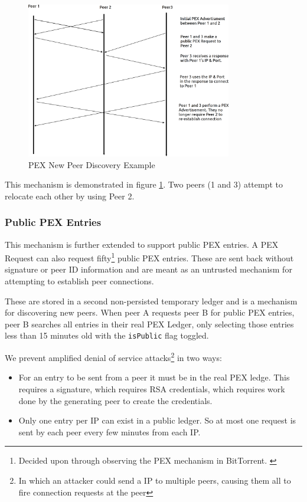 \documentclass[11pt, a4paper, twoside]{report}
\def\code#1{\texttt{#1}}
\begin{document}
\begin{figure}
 \centering
 \includegraphics[width=0.8\textwidth]{pex-new-peer}
 \caption{PEX New Peer Discovery Example}
 \label{fig:pex-new-peer}
\end{figure}

This mechanism is demonstrated in figure \ref{fig:pex-new-peer}. Two peers (1 and 3) attempt to relocate each other by using Peer 2.

\subsubsection{Public PEX Entries}

This mechanism is further extended to support public PEX entries. A PEX Request can also request fifty\footnote{Decided upon through observing the PEX mechanism in BitTorrent. \citep{vuze2010vuze}} public PEX entries. These are sent back without signature or peer ID information and are meant as an untrusted mechanism for attempting to establish peer connections.

These are stored in a second non-persisted temporary ledger and is a mechanism for discovering new peers. When peer A requests peer B for public PEX entries, peer B searches all entries in their real PEX Ledger, only selecting those entries less than 15 minutes old with the \code{isPublic} flag toggled.

We prevent amplified denial of service attacks\footnote{In which an attacker could send a IP to multiple peers, causing them all to fire connection requests at the peer} in two ways:

\begin{itemize}
 \item For an entry to be sent from a peer it must be in the real PEX ledge. This requires a signature, which requires RSA credentials, which requires work done by the generating peer to create the credentials.
 \item Only one entry per IP can exist in a public ledger. So at most one request is sent by each peer every few minutes from each IP.
\end{itemize}
\end{document}
